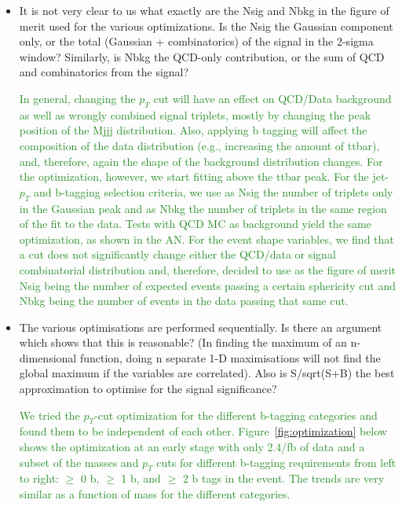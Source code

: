 \documentclass[paper=a4, fontsize=11pt]{scrartcl}
\begin{document}
\begin{itemize}
\begin{itemize}
\item It is not very clear to us what exactly are the Nsig and Nbkg in the figure of merit used for the various optimizations. Is the Nsig the Gaussian component only, or the total (Gaussian + combinatorics) of the signal in the 2-sigma window? Similarly, is Nbkg the QCD-only contribution, or the sum of QCD and combinatorics from the signal?

\textcolor{ForestGreen}{In general, changing the $p_{T}$ cut will have an effect on QCD/Data background as well as wrongly combined signal triplets, mostly
by changing the peak position of the Mjjj distribution. Also, applying b tagging will affect the composition of the data distribution (e.g., increasing the amount of ttbar), and, therefore, again the shape of the background distribution changes. For the optimization, however, we start fitting above the ttbar peak. For the jet-$p_{T}$ and b-tagging selection criteria,  we use as Nsig the number of triplets only in the Gaussian peak and as Nbkg the number of triplets in the same region of the fit to the data. Tests with QCD MC as background yield the same optimization, as shown in the AN. 
For the event shape variables, we find that a cut does not significantly change either the QCD/data or signal combinatorial distribution and, therefore, decided to use as the figure of merit Nsig being the number of expected events passing a certain sphericity cut and Nbkg being the number of events in the data passing that same cut.}\\



\item The various optimisations are performed sequentially. Is there an argument which shows that this is reasonable? (In finding the maximum of an n-dimensional function, doing n separate 1-D maximisations will not find the global maximum if the variables are correlated). Also is S/sqrt(S+B) the best approximation to optimise for the signal significance?

\textcolor{ForestGreen}{We tried the $p_{T}$-cut optimization for the different b-tagging categories and found them to be independent of each other. Figure~\ref{fig:optimization} below shows the optimization at an early stage with only 2.4/fb of data and a subset of the masses and $p_T$ cuts for different b-tagging requirements from left to right: $\geq$ 0 b, $\geq$ 1 b, and $\geq$ 2 b tags in the event. The trends are very similar as a function of mass for the different categories.}


\end{itemize}
\end{itemize}
\end{document}
